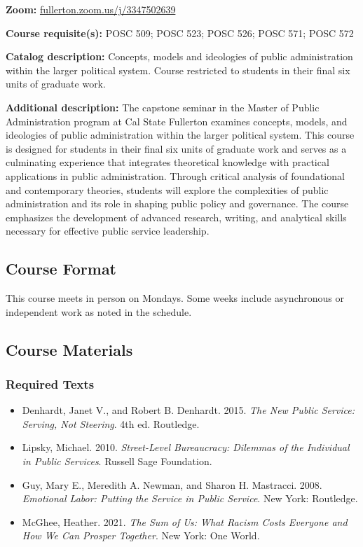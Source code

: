 \documentclass[11pt]{article}     %
\begin{document}
\vspace{0.5em}
\begin{flatlist}
\item \textbf{Zoom:} \href{https://fullerton.zoom.us/j/3347502639}{fullerton.zoom.us/j/3347502639}
\item \textbf{Course requisite(s):} POSC 509; POSC 523; POSC 526; POSC 571; POSC 572
\item \textbf{Catalog description:} Concepts, models and ideologies of public administration within the larger political system. Course restricted to students in their final six units of graduate work.
\item \textbf{Additional description:} The capstone seminar in the Master of Public Administration program at Cal State Fullerton examines concepts, models, and ideologies of public administration within the larger political system. This course is designed for students in their final six units of graduate work and serves as a culminating experience that integrates theoretical knowledge with practical applications in public administration. Through critical analysis of foundational and contemporary theories, students will explore the complexities of public administration and its role in shaping public policy and governance. The course emphasizes the development of advanced research, writing, and analytical skills necessary for effective public service leadership.
\end{flatlist}

\subsection*{Course Format}
This course meets in person on Mondays. Some weeks include asynchronous or independent work as noted in the schedule.

\subsection*{Course Materials}
\subsubsection*{Required Texts}
\begin{itemize}
    \item Denhardt, Janet V., and Robert B. Denhardt. 2015. \textit{The New Public Service: Serving, Not Steering}. 4th ed. Routledge.
    \item Lipsky, Michael. 2010. \textit{Street-Level Bureaucracy: Dilemmas of the Individual in Public Services}. Russell Sage Foundation.
    \item Guy, Mary E., Meredith A. Newman, and Sharon H. Mastracci. 2008. \textit{Emotional Labor: Putting the Service in Public Service}. New York: Routledge.
    \item McGhee, Heather. 2021. \textit{The Sum of Us: What Racism Costs Everyone and How We Can Prosper Together}. New York: One World.
\end{itemize}
\end{document}
